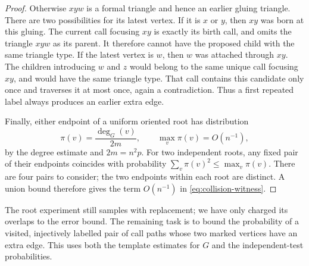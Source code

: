 \begin{proof}
Otherwise $xyw$ is a formal triangle and hence an earlier gluing
triangle.  There are two possibilities for its latest vertex.
If it is $x$ or $y$, then $xy$ was born at this gluing.  The current
call focusing $xy$ is exactly its birth call, and omits the triangle
$xyw$ as its parent.  It therefore cannot have the proposed child
with the same triangle type.  If the latest vertex is $w$, then $w$
was attached through $xy$.  The children introducing $w$ and $z$
would belong to the same unique call focusing $xy$, and would have
the same triangle type.  That call contains this candidate only once
and traverses it at most once, again a contradiction.  Thus a first
repeated label always produces an earlier extra edge.

Finally, either endpoint of a uniform oriented root has distribution
\[
 \pi(v)=\frac{\deg_G(v)}{2m},
 \qquad \max_v\pi(v)=O(n^{-1}),
\]
by the degree estimate and $2m=n^2p$.  For two independent roots, any
fixed pair of their endpoints coincides with probability
$\sum_v\pi(v)^2\le\max_v\pi(v)$.  There are four pairs to consider;
the two endpoints within each root are distinct.  A union bound
therefore gives the term $O(n^{-1})$ in
\eqref{eq:collision-witness}.
\end{proof}

The root experiment still samples with replacement; we have only
charged its overlaps to the error bound.  The remaining task is to
bound the probability of a visited, injectively labelled pair of call
paths whose two marked vertices have an extra edge.  This uses both
the template estimates for $G$ and the independent-test probabilities.

